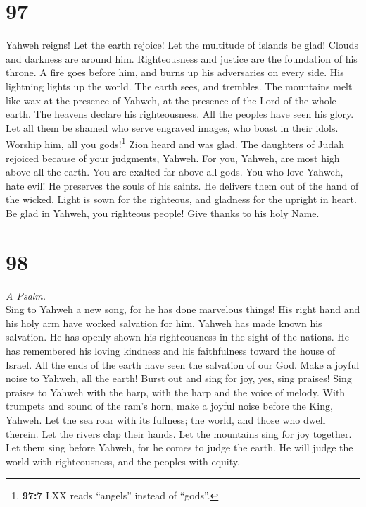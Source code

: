 \hypertarget{section-96}{%
\section{97}\label{section-96}}

 Yahweh reigns! Let the earth rejoice! Let the multitude
of islands be glad!  Clouds and darkness are around him.
Righteousness and justice are the foundation of his throne.
 A fire goes before him, and burns up his adversaries on
every side.  His lightning lights up the world. The earth
sees, and trembles.  The mountains melt like wax at the
presence of Yahweh, at the presence of the Lord of the whole earth.
 The heavens declare his righteousness. All the peoples
have seen his glory.  Let all them be shamed who serve
engraved images, who boast in their idols. Worship him, all you
gods!\footnote{\textbf{97:7} LXX reads ``angels'' instead of ``gods''.}
 Zion heard and was glad. The daughters of Judah rejoiced
because of your judgments, Yahweh.  For you, Yahweh, are
most high above all the earth. You are exalted far above all gods.
 You who love Yahweh, hate evil! He preserves the souls
of his saints. He delivers them out of the hand of the wicked.
 Light is sown for the righteous, and gladness for the
upright in heart.  Be glad in Yahweh, you righteous
people! Give thanks to his holy Name.

\hypertarget{section-97}{%
\section{98}\label{section-97}}

\emph{A Psalm.}\\
 Sing to Yahweh a new song, for he has done marvelous
things! His right hand and his holy arm have worked salvation for him.
 Yahweh has made known his salvation. He has openly shown
his righteousness in the sight of the nations.  He has
remembered his loving kindness and his faithfulness toward the house of
Israel. All the ends of the earth have seen the salvation of our God.
 Make a joyful noise to Yahweh, all the earth! Burst out
and sing for joy, yes, sing praises!  Sing praises to
Yahweh with the harp, with the harp and the voice of melody.
 With trumpets and sound of the ram's horn, make a joyful
noise before the King, Yahweh.  Let the sea roar with its
fullness; the world, and those who dwell therein.  Let the
rivers clap their hands. Let the mountains sing for joy together.
 Let them sing before Yahweh, for he comes to judge the
earth. He will judge the world with righteousness, and the peoples with
equity.

